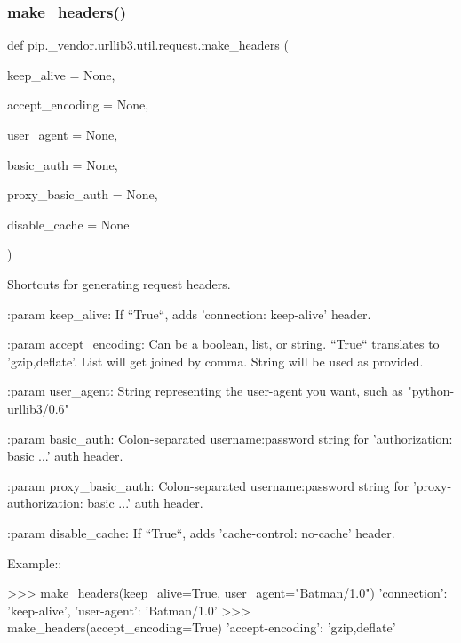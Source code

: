 \subsubsection{\texorpdfstring{make\+\_\+headers()}{make\_headers()}}
{\footnotesize\ttfamily def pip.\+\_\+vendor.\+urllib3.\+util.\+request.\+make\+\_\+headers (\begin{DoxyParamCaption}\item[{}]{keep\+\_\+alive = {\ttfamily None},  }\item[{}]{accept\+\_\+encoding = {\ttfamily None},  }\item[{}]{user\+\_\+agent = {\ttfamily None},  }\item[{}]{basic\+\_\+auth = {\ttfamily None},  }\item[{}]{proxy\+\_\+basic\+\_\+auth = {\ttfamily None},  }\item[{}]{disable\+\_\+cache = {\ttfamily None} }\end{DoxyParamCaption})}

\begin{DoxyVerb}Shortcuts for generating request headers.

:param keep_alive:
    If ``True``, adds 'connection: keep-alive' header.

:param accept_encoding:
    Can be a boolean, list, or string.
    ``True`` translates to 'gzip,deflate'.
    List will get joined by comma.
    String will be used as provided.

:param user_agent:
    String representing the user-agent you want, such as
    "python-urllib3/0.6"

:param basic_auth:
    Colon-separated username:password string for 'authorization: basic ...'
    auth header.

:param proxy_basic_auth:
    Colon-separated username:password string for 'proxy-authorization: basic ...'
    auth header.

:param disable_cache:
    If ``True``, adds 'cache-control: no-cache' header.

Example::

    >>> make_headers(keep_alive=True, user_agent="Batman/1.0")
    {'connection': 'keep-alive', 'user-agent': 'Batman/1.0'}
    >>> make_headers(accept_encoding=True)
    {'accept-encoding': 'gzip,deflate'}
\end{DoxyVerb}
 \mbox{\label{namespacepip_1_1__vendor_1_1urllib3_1_1util_1_1request_af3514df102b2e3bafa34690419e6d7f2}} 
